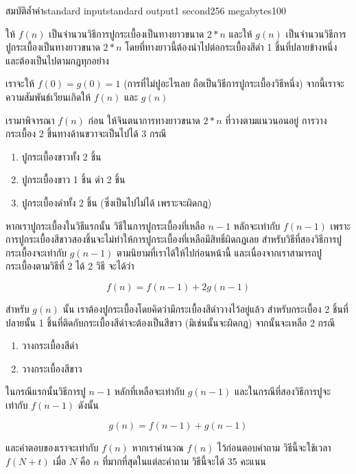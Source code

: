 \documentclass[11pt,a4paper]{article}
\begin{document}
\pagebreak

\begin{problem}{สมบัติล้ำค่า}{standard input}{standard output}{1 second}{256 megabytes}{100}

ให้ $f(n)$ เป็นจำนวนวิธีการปูกระเบื้องเป็นทางยาวขนาด $2*n$ และให้ $g(n)$ เป็นจำนวนวิธีการปูกระเบื้องเป็นทางยาวขนาด $2*n$ โดยที่ทางยาวนี้ต้องนำไปต่อกระเบื้องสีดำ 1 ชิ้นที่ปลายข้างหนึ่ง และต้องเป็นไปตามกฎทุกอย่าง

เราจะให้ $f(0) = g(0) = 1$ (การที่ไม่ปูอะไรเลย ถือเป็นวิธีการปูกระเบื้องวิธีหนึ่ง) จากนี้เราจะความสัมพันธ์เวียนเกิดให้ $f(n)$ และ $g(n)$

เรามาพิจารณา $f(n)$ ก่อน ให้จินตนาการทางยาวขนาด $2*n$ ที่วางตามแนวนอนอยู่ การวางกระเบื้อง 2 ชิ้นทางด้านขวาจะเป็นไปได้ 3 กรณี

\begin{enumerate}
\item ปูกระเบื้องขาวทั้ง 2 ชิ้น 
\item ปูกระเบื้องขาว 1 ชิ้น ดำ 2 ชิ้น
\item ปูกระเบื้องดำทั้ง 2 ชิ้น (ซึ่งเป็นไปไม่ได้ เพราะจะผิดกฎ)
\end{enumerate}

หากเราปูกระเบื้องในวิธีแรกนั้น วิธีในการปูกระเบื้องที่เหลือ $n-1$ หลักจะเท่ากับ $f(n-1)$ เพราะการปูกระเบื้องสีขาวสองชิ้นจะไม่ทำให้การปูกระเบื้องที่เหลือมีสิทธิ์ผิดกฎเลย สำหรับวิธีที่สองวิธีการปูกระเบื้องจะเท่ากับ $g(n-1)$  ตามนิยามที่เราได้ให้ไปก่อนหน้านี้ และเนื่องจากเราสามารถปูกระเบื้องตามวิธีที่ 2 ได้ 2 วิธี จะได้ว่า

$$f(n) = f(n-1)+2g(n-1)$$

สำหรับ $g(n)$ นั้น เราต้องปูกระเบื้องโดยคิดว่ามีกระเบื้องสีดำวางไว้อยู่แล้ว สำหรับกระเบื้อง 2 ชิ้นที่ปลายนั้น 1 ชิ้นที่ติดกับกระเบื้องสีดำจะต้องเป็นสีขาว (มิเช่นนั้นจะผิดกฎ) จากนั้นจะเหลือ 2 กรณี

\begin{enumerate}
\item วางกระเบื้องสีดำ
\item วางกระเบื้องสีขาว
\end{enumerate}

ในกรณีแรกนั้นวิธีการปู $n-1$ หลักที่เหลือจะเท่ากับ $g(n-1)$ และในกรณีที่สองวิธีการปูจะเท่ากับ $f(n-1)$ ดังนั้น

$$g(n) = f(n-1)+g(n-1)$$

และคำตอบของเราจะเท่ากับ $f(n)$ หากเราคำนวณ $f(n)$ ไว้ก่อนตอบคำถาม วิธีนี้จะใช้เวลา $f(N + t)$ เมื่อ $N$ คือ $n$ ที่มากที่สุดในแต่ละคำถาม วิธีนี้จะได้ 35 คะแนน


\end{problem}
\end{document}
